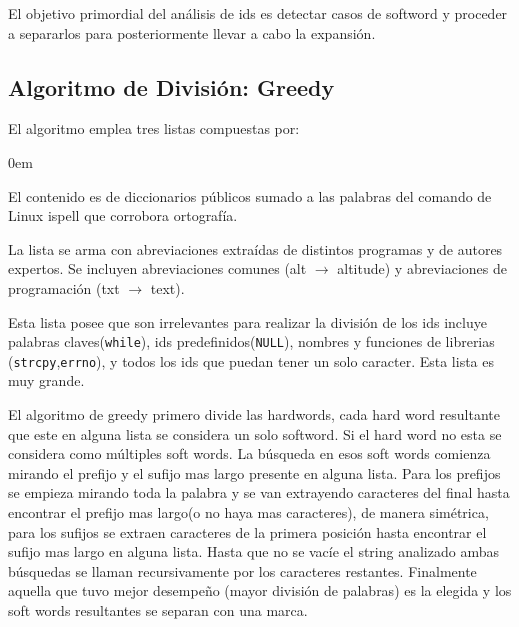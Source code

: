 \documentclass[12pt]{report}
\begin{document}
\begin{framed}
\noindent El objetivo primordial del análisis de ids es detectar casos de softword y proceder a separarlos para posteriormente llevar a cabo la expansión\cite{FBL06,LFBEX07}.  
\end{framed}



\subsection{Algoritmo de División: Greedy}

El algoritmo emplea tres listas compuestas por\cite{FBL06,LFBEX07}: 
\begin{description}
\itemsep0em%
\item[Palabras del diccionario:] El contenido es de diccionarios públicos sumado a las palabras del comando de Linux \textsf{ispell} que corrobora ortografía.

\item[Abreviaciones conocidas:] La lista se arma con abreviaciones extraídas de distintos programas y de autores expertos. Se incluyen abreviaciones comunes (\textsf{alt} $\rightarrow$ \textsf{altitude}) y abreviaciones de programación (\textsf{txt} $\rightarrow$ \textsf{text}).

\item[Palabras excluyentes(stop list):] Esta lista posee que son irrelevantes para realizar la división de los ids incluye palabras claves(\texttt{while}), ids predefinidos(\texttt{NULL}), nombres y funciones de librerias (\texttt{strcpy},\texttt{errno}), y todos los ids que puedan tener un solo caracter. Esta lista es muy grande.
\end{description}

El algoritmo de greedy primero divide las hardwords, cada hard word resultante que este en alguna lista se considera un solo softword. Si el hard word no esta se considera como múltiples soft words. La búsqueda en esos soft words comienza mirando el prefijo y el sufijo mas largo presente en alguna lista. Para los prefijos se empieza mirando toda la palabra y se van extrayendo caracteres del final hasta encontrar el prefijo mas largo(o no haya mas caracteres), de manera simétrica, para los sufijos se extraen caracteres de la primera posición hasta encontrar el sufijo mas largo en alguna lista. Hasta que no se vacíe el string analizado ambas búsquedas se llaman recursivamente por los caracteres restantes. Finalmente aquella que tuvo mejor desempeño (mayor división de palabras) es la elegida y los soft words resultantes se separan con una marca\cite{FBL06,LFBEX07}.
\end{document}
